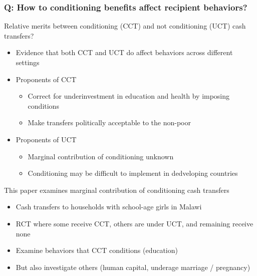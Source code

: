 \documentclass[aspectratio=169]{beamer}
\begin{document}
\begin{frame}
\frametitle{Q: How to conditioning benefits affect recipient behaviors?} 
Relative merits between conditioning (CCT) and not conditioning (UCT) cash transfers?
\begin{itemize}\setlength\itemsep{3pt}
 \item Evidence that both CCT and UCT do affect behaviors across different settings
 \item Proponents of CCT 
\begin{itemize}\setlength\itemsep{3pt}
\item Correct for underinvestment in education and health by imposing conditions
\item Make transfers politically acceptable to the non-poor
\end{itemize}
\item Proponents of UCT
\begin{itemize}\setlength\itemsep{3pt}
\item Marginal contribution of conditioning unknown
\item Conditioning may be difficult to implement in dedveloping countries
\end{itemize}
\end{itemize}\medskip
This paper examines marginal contribution of conditioning cash transfers
\begin{itemize}\setlength\itemsep{3pt}
  \item Cash transfers to households with school-age girls in Malawi
  \item RCT where some receive CCT, others are under UCT, and remaining  receive none
  \item Examine behaviors that CCT conditions (education) 
  \item But also investigate others (human capital, underage marriage / pregnancy)
  \end{itemize}
\end{frame}
\end{document}

